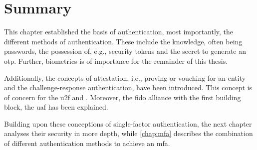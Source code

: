 \newpage
\section{Summary}

This chapter established the basis of authentication, most importantly, the different methods of authentication. These include the knowledge, often being passwords, the possession of, e.g., security tokens and the secret to generate an \gls{otp}. Further, biometrics is of importance for the remainder of this thesis.

Additionally, the concepts of attestation, i.e., proving or vouching for an entity and the challenge-response authentication, have been introduced. This concept is of concern for the \gls{u2f} and \wa. Moreover, the \gls{fido} alliance with the first building block, the \gls{uaf} has been explained.

Building upon these conceptions of single-factor authentication, the next chapter analyses their security in more depth, while \autoref{chap:mfa} describes the combination of different authentication methods to achieve an \gls{mfa}.